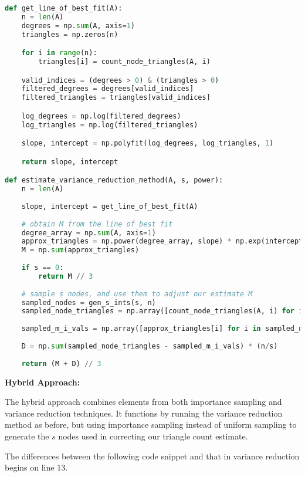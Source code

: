 \documentclass[11pt]{article}
\begin{document}
\begin{lstlisting}[language=Python]
def get_line_of_best_fit(A):
    n = len(A)
    degrees = np.sum(A, axis=1)
    triangles = np.zeros(n)

    for i in range(n):
        triangles[i] = count_node_triangles(A, i)

    valid_indices = (degrees > 0) & (triangles > 0)
    filtered_degrees = degrees[valid_indices]
    filtered_triangles = triangles[valid_indices]

    log_degrees = np.log(filtered_degrees)
    log_triangles = np.log(filtered_triangles)

    slope, intercept = np.polyfit(log_degrees, log_triangles, 1)

    return slope, intercept

def estimate_variance_reduction_method(A, s, power):
    n = len(A)
  
    slope, intercept = get_line_of_best_fit(A)
  
    # obtain M from the line of best fit
    degree_array = np.sum(A, axis=1)
    approx_triangles = np.power(degree_array, slope) * np.exp(intercept)
    M = np.sum(approx_triangles)
  
    if s == 0:
        return M // 3
  
    # sample s nodes, and use them to adjust our estimate M
    sampled_nodes = gen_s_ints(s, n)
    sampled_node_triangles = np.array([count_node_triangles(A, i) for i in sampled_nodes])
  
    sampled_m_i_vals = np.array([approx_triangles[i] for i in sampled_nodes])
  
    D = np.sum(sampled_node_triangles - sampled_m_i_vals) * (n/s)
  
    return (M + D) // 3
\end{lstlisting}

\textbf{Hybrid Approach:}

The hybrid approach combines elements from both importance sampling and variance reduction techniques.
It functions by running the variance reduction method as before, but using importance sampling instead of uniform sampling to generate the $s$ nodes used in correcting our triangle count estimate.

The differences between the following code snippet and that in variance reduction begins on line 13.
\end{document}
